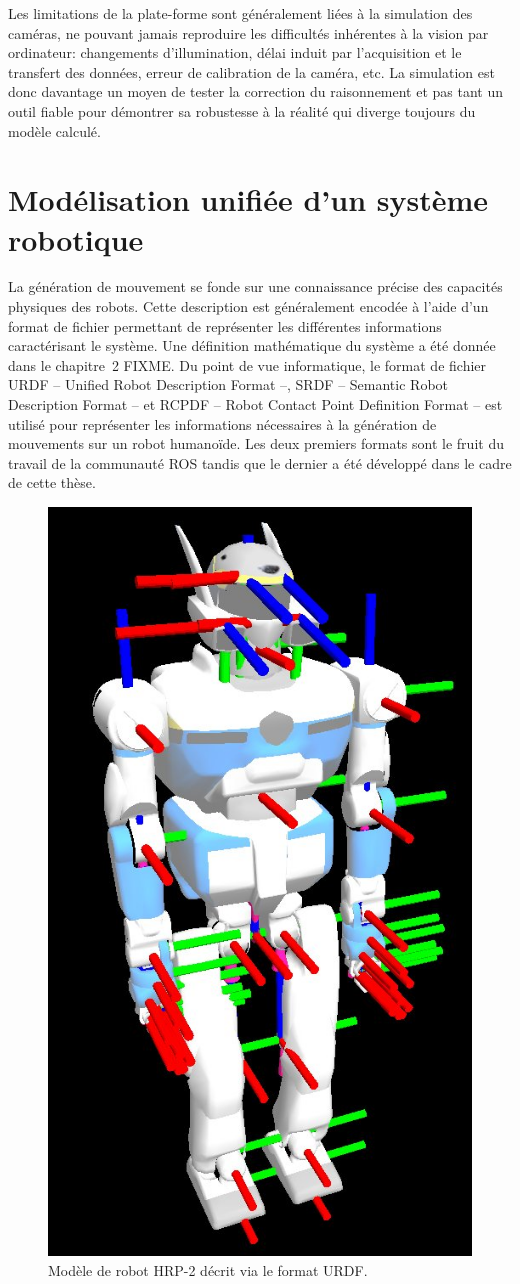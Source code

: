 Les limitations de la plate-forme sont généralement liées à la
simulation des caméras, ne pouvant jamais reproduire les difficultés
inhérentes à la vision par ordinateur: changements d'illumination,
délai induit par l'acquisition et le transfert des données, erreur de
calibration de la caméra, etc. La simulation est donc davantage un
moyen de tester la correction du raisonnement et pas tant un outil
fiable pour démontrer sa robustesse à la réalité qui diverge toujours
du modèle calculé.


\section{Modélisation unifiée d'un système robotique}


La génération de mouvement se fonde sur une connaissance précise des
capacités physiques des robots. Cette description est généralement
encodée à l'aide d'un format de fichier permettant de représenter les
différentes informations caractérisant le système. Une définition
mathématique du système a été donnée dans le chapitre 2 FIXME. Du
point de vue informatique, le format de fichier URDF -- Unified Robot
Description Format --, SRDF -- Semantic Robot Description Format -- et
RCPDF -- Robot Contact Point Definition Format -- est utilisé pour
représenter les informations nécessaires à la génération de mouvements
sur un robot humanoïde. Les deux premiers formats sont le fruit du
travail de la communauté ROS tandis que le dernier a été développé
dans le cadre de cette thèse.

\begin{figure}
  \begin{center}
    \includegraphics[width=.45\linewidth]{src/chap4-integration/hrp2_urdf.jpg}
  \end{center}
  \caption{Modèle de robot HRP-2 décrit via le format URDF.}
\end{figure}



